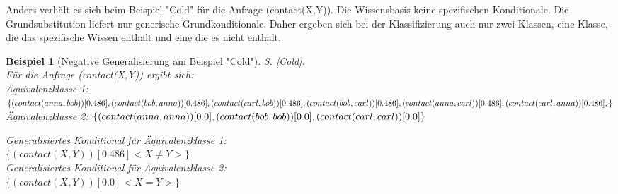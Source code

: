 \documentclass[a4paper, 11pt]{book}
\newtheorem{Bsp}{Beispiel}[section]
\begin{document}
Anders verhält es sich beim Beispiel "{}Cold"{} für die Anfrage (contact(X,Y)). Die Wissensbasis keine spezifischen Konditionale. Die Grundsubstitution liefert nur generische Grundkonditionale. Daher ergeben sich bei der Klassifizierung auch nur zwei Klassen, eine Klasse, die das spezifische Wissen enthält und eine die es nicht enthält.  
\begin{Bsp}[Negative Generalisierung am Beispiel "{}Cold"{}]
	S. \ref{Cold}.\\ 
	Für die Anfrage (contact(X,Y)) ergibt sich:\\
	
	\noindent
		Äquivalenzklasse 1: $ \{(contact(anna,bob))[0.486], (contact(bob,anna))[0.486],\\ (contact(carl,bob))[0.486], (contact(bob,carl))[0.486], (contact(anna,carl))[0.486],\\(contact(carl,anna))[0.486],\} $\\
		Äquivalenzklasse 2: $ \{(contact(anna,anna))[0.0], (contact(bob,bob))[0.0],  \\(contact(carl, carl))[0.0]\} $

	\noindent
		Generalisiertes Konditional für Äquivalenzklasse 1: \\$ \{(contact(X,Y))[0.486]<X \neq Y>\} $\\
	Generalisiertes Konditional für Äquivalenzklasse 2:\\ $ \{(contact(X,Y))[0.0]<X=Y>\} $\\

\end{Bsp}
\end{document}
